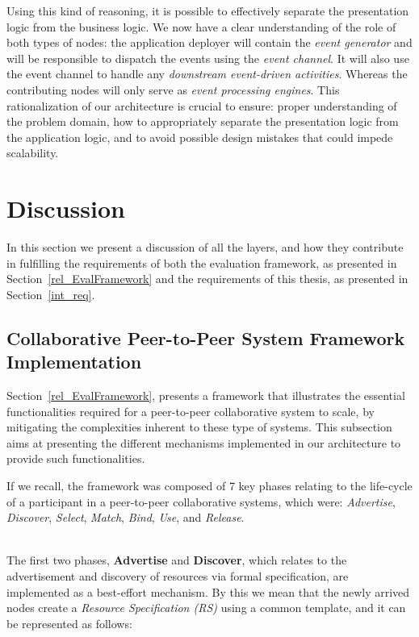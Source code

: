 \documentclass[12pt, titlepage]{uo_temp}
\begin{document}
     Using this kind of reasoning, it is possible to effectively separate the 
     presentation logic from the business logic. We now have a clear understanding of the
     role of both types of nodes: the application deployer will contain the \emph{event
       generator} and will be responsible to dispatch the events using the \emph{event
       channel}. It will also use the event channel to handle any \emph{downstream
       event-driven activities}. Whereas the contributing nodes will only serve as
     \emph{event processing engines}. This rationalization of our architecture is
     crucial to ensure: proper understanding of the problem domain, how to appropriately
     separate the presentation logic from the application logic, and to avoid possible
     design mistakes that could impede scalability.

     \section{Discussion}
     In this section we present a discussion of all the layers, and how they contribute in
     fulfilling the requirements of both the evaluation framework, as presented in
     Section~\ref{rel_EvalFramework} and the requirements of this thesis, as
     presented in Section~\ref{int_req}.

     \subsection{Collaborative Peer-to-Peer System Framework Implementation}
     Section~\ref{rel_EvalFramework}, presents a framework that illustrates the essential
     functionalities required for a peer-to-peer collaborative system to scale, by
     mitigating the complexities inherent to these type of systems. This subsection aims
     at presenting the different mechanisms implemented in our architecture to provide
     such functionalities.

     If we recall, the framework was composed of 7 key phases relating to the life-cycle
     of a participant in a peer-to-peer collaborative systems, which were:
     \emph{Advertise}, \emph{Discover}, \emph{Select}, \emph{Match}, \emph{Bind},
     \emph{Use}, and \emph{Release}.

     \\ The first two phases, \textbf{Advertise} and \textbf{Discover}, which relates to
     the advertisement and discovery of resources via formal specification, are
     implemented as a best-effort mechanism. By this we mean that the newly arrived nodes
     create a \emph{Resource Specification (RS)} using a common template, and it can be
     represented as follows:
\end{document}
